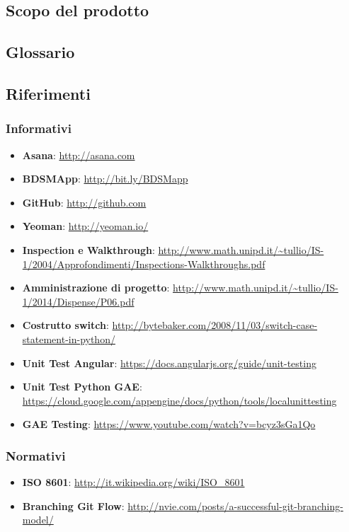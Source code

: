 	\subsection{Scopo del prodotto}
		\productScope

	\subsection{Glossario}
		\glossarioDesc

	\subsection{Riferimenti}
		\subsubsection{Informativi}
		\begin{itemize}
			\item \textbf{Asana}: \url{http://asana.com}
			\item \textbf{BDSMApp}: \url{http://bit.ly/BDSMapp}
			\item \textbf{GitHub}: \url{http://github.com}
			\item \textbf{Yeoman}: \url{http://yeoman.io/}
			\item \textbf{Inspection e Walkthrough}: \url{http://www.math.unipd.it/~tullio/IS-1/2004/Approfondimenti/Inspections-Walkthroughs.pdf}
			\item \textbf{Amministrazione di progetto}: \url{http://www.math.unipd.it/~tullio/IS-1/2014/Dispense/P06.pdf}
			\item \textbf{Costrutto switch}: \url{http://bytebaker.com/2008/11/03/switch-case-statement-in-python/}
			\item \textbf{Unit Test Angular}: \url{https://docs.angularjs.org/guide/unit-testing}
			\item \textbf{Unit Test Python GAE}: \url{https://cloud.google.com/appengine/docs/python/tools/localunittesting}
			\item \textbf{GAE Testing}: \url{https://www.youtube.com/watch?v=bcyz3sGa1Qo}
		\end{itemize}

		\subsubsection{Normativi}
		\begin{itemize}
			\item \textbf{ISO 8601}: \url{http://it.wikipedia.org/wiki/ISO_8601}
			\item \textbf{Branching Git Flow}: \url{http://nvie.com/posts/a-successful-git-branching-model/}
		\end{itemize}